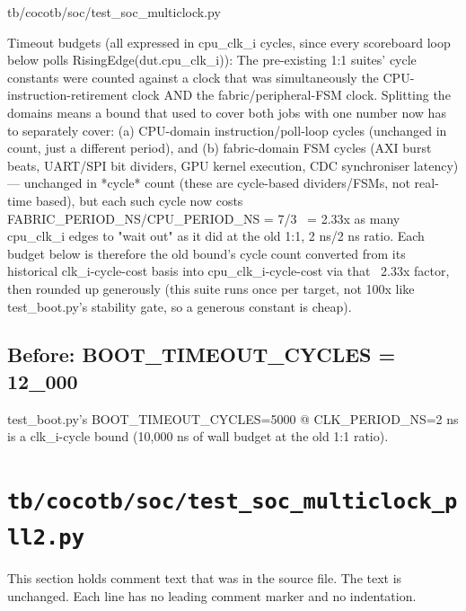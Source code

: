 \begin{relocated}{tb/cocotb/soc/test_soc_multiclock.py}
\begin{textblock}
Timeout budgets (all expressed in cpu_clk_i cycles, since every scoreboard
loop below polls RisingEdge(dut.cpu_clk_i)):
The pre-existing 1:1 suites' cycle constants were counted against a clock
that was simultaneously the CPU-instruction-retirement clock AND the
fabric/peripheral-FSM clock. Splitting the domains means a bound that
used to cover both jobs with one number now has to separately cover:
(a) CPU-domain instruction/poll-loop cycles (unchanged in count, just a
different period), and
(b) fabric-domain FSM cycles (AXI burst beats, UART/SPI bit dividers,
GPU kernel execution, CDC synchroniser latency) — unchanged in
*cycle* count (these are cycle-based dividers/FSMs, not real-time
based), but each such cycle now costs FABRIC_PERIOD_NS/CPU_PERIOD_NS
= 7/3 ~= 2.33x as many cpu_clk_i edges to "wait out" as it did at
the old 1:1, 2 ns/2 ns ratio.
Each budget below is therefore the old bound's cycle count converted from
its historical clk_i-cycle-cost basis into cpu_clk_i-cycle-cost via that
~2.33x factor, then rounded up generously (this suite runs once per
target, not 100x like test_boot.py's stability gate, so a generous
constant is cheap).
\end{textblock}

\subsection*{Before: BOOT\_TIMEOUT\_CYCLES = 12\_000}

\begin{textblock}
test_boot.py's BOOT_TIMEOUT_CYCLES=5000 @ CLK_PERIOD_NS=2 ns is a
clk_i-cycle bound (10,000 ns of wall budget at the old 1:1 ratio).
\end{textblock}

\end{relocated}

\section{\texttt{tb/cocotb/soc/test\_soc\_multiclock\_pll2.py}}\label{tm:suite:soc-test-soc-multiclock-pll2}

This section holds comment text that was in the source file. The text is unchanged. Each line has no leading comment marker and no indentation.

